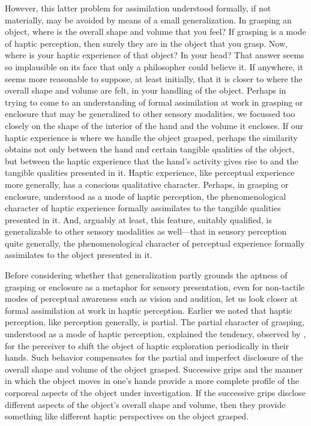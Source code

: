 However, this latter problem for assimilation understood formally, if not materially, may be avoided by means of a small generalization. In grasping an object, where is the overall shape and volume that you feel? If grasping is a mode of haptic perception, then surely they are in the object that you grasp. Now, where is your haptic experience of that object? In your head? That answer seems so implausible on its face that only a philosopher could believe it. If anywhere, it seems more reasonable to suppose, at least initially, that it is closer to where the overall shape and volume are felt, in your handling of the object. Perhaps in trying to come to an understanding of formal assimilation at work in grasping or enclosure that may be generalized to other sensory modalities, we focussed too closely on the shape of the interior of the hand and the volume it encloses. If our haptic experience is where we handle the object grasped, perhaps the similarity obtains not only between the hand and certain tangible qualities of the object, but between the haptic experience that the hand's activity gives rise to and the tangible qualities presented in it. Haptic experience, like perceptual experience more generally, has a conscious qualitative character. Perhaps, in grasping or enclosure, understood as a mode of haptic perception, the phenomenological character of haptic experience formally assimilates to the tangible qualities presented in it. And, arguably at least, this feature, suitably qualified, is generalizable to other sensory modalities as well---that in sensory perception quite generally, the phenomenological character of perceptual experience formally assimilates to the object presented in it.

Before considering whether that generalization partly grounds the aptness of grasping or enclosure as a metaphor for sensory presentation, even for non-tactile modes of perceptual awareness such as vision and audition, let us look closer at formal assimilation at work in haptic perception. Earlier we noted that haptic perception, like perception generally, is partial. The partial character of grasping, understood as a mode of haptic perception, explained the tendency, observed by \citet{Lederman:1987fr}, for the perceiver to shift the object of haptic exploration periodically in their hands. Such behavior compensates for the partial and imperfect disclosure of the overall shape and volume of the object grasped. Successive grips and the manner in which the object moves in one's hands provide a more complete profile of the corporeal aspects of the object under investigation. If the successive grips disclose different aspects of the object's overall shape and volume, then they provide something like different haptic perspectives on the object grasped. 

